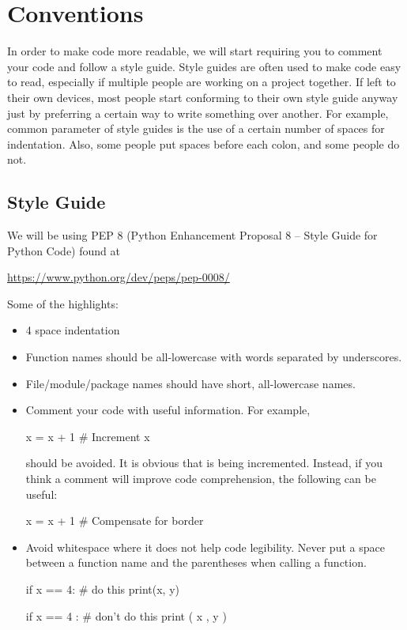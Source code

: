 \documentclass[11pt]{cselabheader}
\begin{document}
\pagebreak
\section{Conventions}
\label{sec:pep8}

In order to make code more readable, we will start requiring you to comment your
code and follow a style guide. Style guides are often used to make code easy to
read, especially if multiple people are working on a project together. If left
to their own devices, most people start conforming to their own style guide
anyway just by preferring a certain way to write something over another. For
example, common parameter of style guides is the use of a certain number of
spaces for indentation. Also, some people put spaces before each colon, and some
people do not.

\subsection{Style Guide}

We will be using PEP 8 (Python Enhancement Proposal 8 -- Style Guide for Python
Code) found at
\begin{center}
  \url{https://www.python.org/dev/peps/pep-0008/}
\end{center}

Some of the highlights:
\begin{itemize}
  \item 4 space indentation
  \item Function names should be all-lowercase with words separated by underscores.
  \item File/module/package names should have short, all-lowercase names.
  \item Comment your code with useful information. For example,

    \begin{python3code}
x = x + 1 # Increment x
    \end{python3code}

    should be avoided. It is obvious that  is being incremented.
    Instead, if you think a comment will improve code comprehension, the
    following can be useful:

    \begin{python3code}
x = x + 1 # Compensate for border
    \end{python3code}

  \item Avoid whitespace where it does not help code legibility. Never put a
    space between a function name and the parentheses when calling a function.

    \begin{python3code}
if x == 4: # do this
    print(x, y)

if x == 4 : # don't do this
    print ( x , y )
    \end{python3code}
\end{itemize}
\end{document}
